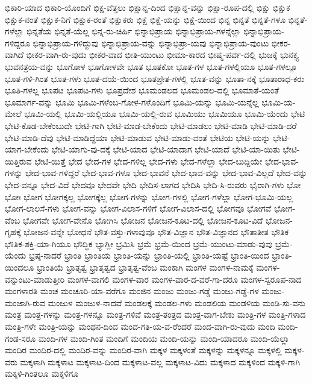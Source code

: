 {ಭಿಕಾರಿ-ಯಾದ
ಭಿಕಾರಿ-ಯೊಂದಿಗೆ
ಭಿಕ್ಷ-ವೆತ್ತಲು
ಭಿಕ್ಷಾನ್ನ-ದಿಂದ
ಭಿಕ್ಷಾನ್ನ-ವನ್ನು
ಭಿಕ್ಷಾ-ರೂಪ-ದಲ್ಲಿ
ಭಿಕ್ಷು
ಭಿಕ್ಷುಕ
ಭಿಕ್ಷುಕ-ನಂತೆ
ಭಿಕ್ಷುಕ-ನಿಗೆ
ಭಿಕ್ಷುಕ-ರಂತೆ
ಭಿಕ್ಷುಕರು
ಭಿಕ್ಷೆ
ಭಿಕ್ಷೆ-ಯನ್ನು
ಭಿಕ್ಷೆ-ಯಿಂದ
ಭಿನ್ನ
ಭಿನ್ನತೆ
ಭಿನ್ನತೆ-ಗಳೂ
ಭಿನ್ನತೆ-ಗಳೆಲ್ಲಾ
ಭಿನ್ನತೆಯ
ಭಿನ್ನತೆ-ಯೆಲ್ಲ
ಭಿನ್ನ-ರು-ಚಿರ್ಹಿ
ಭಿನ್ನಾಭಿಪ್ರಾಯ
ಭಿನ್ನಾಭಿಪ್ರಾಯ-ಗಳನ್ನೆಲ್ಲಾ
ಭಿನ್ನಾಭಿಪ್ರಾಯ-ಗಳಿದ್ದರೂ
ಭಿನ್ನಾಭಿಪ್ರಾಯ-ಗಳಿದ್ದುವು
ಭಿನ್ನಾಭಿಪ್ರಾಯ-ವನ್ನು
ಭಿನ್ನಾಭಿಪ್ರಾ-ಯವು
ಭಿನ್ನಾಭಿಪ್ರಾಯ-ವುಂಟು
ಭೀಕರ-ವಾಗಿದೆ
ಭೀಕರ-ವಾಗಿ-ರು-ವುದು
ಭೀಕರ-ವಾದ
ಭೀತಿ-ಯುಂಟು
ಭೀಮಾ-ಕಾರದ
ಭೀಷ್ಮ-ಪರ್ವ-ದಲ್ಲಿ
ಭುಜಕ್ಕೆ
ಭುನಕ್ತ್ಯ
ಭುವನತ್ರಯ-ವನ್ನು
ಭೂಗೋಳ
ಭೂಗೋಳವೇ
ಭೂತ
ಭೂತಕೋ
ಭೂತ-ಗಳ
ಭೂತ-ಗಳಲ್ಲಿಯೂ
ಭೂತ-ಗಳಲ್ಲೂ
ಭೂತ-ಗಳಿ-ಗಿಂತ
ಭೂತ-ಗಳು
ಭೂತ-ದಯೆ-ಯಿಂದ
ಭೂತಪ್ರೇತ-ಗಳಲ್ಲಿ
ಭೂತ-ವನ್ನು
ಭೂತಾ-ನಕ್ಕೆ
ಭೂತಾರಾಧ-ಕರು
ಭೂತಿ-ಗಳಲ್ಲ
ಭೂಪಟ
ಭೂಪಟ-ಗಳು
ಭೂಪ್ರದೇಶ
ಭೂಮಂಡಲದ
ಭೂಮಂಡಲ-ದಲ್ಲಿ
ಭೂಮಾತೆ-ಯಂತೆ
ಭೂಮಾರ್ಗ-ವನ್ನು
ಭೂಮಿ
ಭೂಮಿ-ಗಳೆಂಬ-ಗೋಳ-ಗಳೊಂದಿಗೆ
ಭೂಮಿ-ಯನ್ನು
ಭೂಮಿ-ಯನ್ನೆಲ್ಲ
ಭೂಮಿ-ಯ-ಮೇಲೆ
ಭೂಮಿ-ಯಲ್ಲಿ
ಭೂಮಿ-ಯಲ್ಲಿಯೂ
ಭೂಮಿ-ಯಲ್ಲಿ-ರುವ
ಭೂಮಿಯು
ಭೂಮಿಯೂ
ಭೂಮಿ-ಯೆಂದು
ಭೇಟಿ
ಭೇಟಿ-ಕೊಡ-ಬೇಕೆಂಬುದೇ
ಭೇಟಿ-ಗಾಗಿ
ಭೇಟಿ-ಮಾಡ-ಬೇಕೆಂದು
ಭೇಟಿ-ಮಾಡಲು
ಭೇಟಿ-ಮಾಡಿ
ಭೇಟಿ-ಮಾಡಿ-ದರೆ
ಭೇಟಿ-ಮಾಡಿ-ದೆವು
ಭೇಟಿ-ಮಾಡಿದ್ದೆಯಾ
ಭೇಟಿ-ಮಾಡುವ
ಭೇಟಿ-ಮಾಡು-ವಂತೆ
ಭೇಟಿಯ
ಭೇಟಿ-ಯನ್ನು
ಭೇಟಿ-ಯಾಗ-ಬೇಕೆಂದು
ಭೇಟಿ-ಯಾಗು-ವು-ದಕ್ಕೆ
ಭೇಟಿ-ಯಾದ
ಭೇಟಿ-ಯಾದಾಗ
ಭೇಟಿ-ಯಾದೆ
ಭೇಟಿ-ಯಾ-ಯಿತು
ಭೇಟಿ-ಯಿತ್ತಿರುವ
ಭೇಟಿ-ಯಿತ್ತೆ
ಭೇದ
ಭೇದ-ಗಳ
ಭೇದ-ಗಳಿಲ್ಲ
ಭೇದ-ಗಳು
ಭೇದ-ಗಳೆಲ್ಲಾ
ಭೇದ-ಬುದ್ದಿಯೇ
ಭೇದ-ಭಾವ-ಗಳನ್ನು
ಭೇದ-ಭಾವ-ಗಳಿದ್ದರೆ
ಭೇದ-ಭಾವ-ಗಳೂ
ಭೇದ-ಭಾವನೆ
ಭೇದ-ಭಾವ-ವನ್ನು
ಭೇದ-ಭಾವ-ವಿಲ್ಲದೆ
ಭೇದ-ವನ್ನು
ಭೇದ-ವನ್ನೂ
ಭೇದ-ವಿದೆ
ಭೇದವೂ
ಭೇದವೇ
ಭೇದಿ
ಭೇದಿಸ-ಲಾಗದ
ಭೇದಿಸಿ
ಭೇದಿ-ಸಿ-ರುವರು
ಭೈರಾಗಿ-ಗಳು
ಭೋ
ಭೋಃ
ಭೋಗ
ಭೋಗಕ್ಕಲ್ಲ
ಭೋಗಕ್ಕೆಲ್ಲ
ಭೋಗ-ಗಳನ್ನು
ಭೋಗ-ಗಳಲ್ಲಿ
ಭೋಗ-ಗಳೆಲ್ಲಾ
ಭೋಗ-ಭೂಮಿ-ಯಲ್ಲ
ಭೋಗ-ಲಾಲಸೆ-ಗಳು
ಭೋಗ-ವನ್ನು
ಭೋಗ-ವಿಲಾಸ-ಗಳಿಗೆ
ಭೋಗ-ವಿಲಾಸ-ದಲ್ಲಿ
ಭೋಗವೂ
ಭೋಗವೆ
ಭೋಗ-ವೆಂಬ
ಭೋಗವೇ
ಭೋಗ-ವೇನೊ
ಭೋಗಿಸಿ
ಭೋಜನ
ಭೋಜನ-ಕೂಟ-ದಲ್ಲಿ
ಭೋಜನ-ಕೂಟ-ವಿದೆ
ಭೋಜನ-ಗೃಹಕ್ಕೆ
ಭೋಜನ-ವನ್ನೇ
ಭೋಧನೆ
ಭೌತ-ವಸ್ತು-ಗಳಾವುವೂ
ಭೌತ-ವಿಜ್ಞಾನ
ಭೌತ-ವಿಜ್ಞಾನದ
ಭೌತಾತೀತ
ಭೌತಿಕ
ಭೌತಿಕ-ಶಕ್ತಿ-ಯಾ-ಗಿಯೂ
ಭೌದ್ಧಿಕ
ಭ್ಯಾಗ್ಲೀ
ಭ್ರಮಿಸಿ
ಭ್ರಮೆ
ಭ್ರಮೆ-ಯಿಂದ
ಭ್ರಮೆ-ಯುಂಟು-ಮಾಡು-ವುವು
ಭ್ರಮೆ-ಯೆಂದು
ಭ್ರಷ್ಠ-ನಾದರೆ
ಭ್ರಾಂತಿ
ಭ್ರಾಂತಿಯ
ಭ್ರಾಂತಿ-ಯನ್ನು
ಭ್ರಾಂತಿ-ಯಲ್ಲಿ
ಭ್ರಾಂತಿ-ಯಷ್ಟೆ
ಭ್ರಾಂತಿ-ಯಿಂದ
ಭ್ರಾಂತಿ-ಯಿಂದಲೂ
ಭ್ರಾಂತಿಯೆ
ಭ್ರಾತೃತ್ವ
ಭ್ರಾತೃತ್ವದ
ಭ್ರಾತೃತ್ವ-ವೆಂಬ
ಮಂಕಾಗಿ
ಮಂಗಳ
ಮಂಗಳ-ನಾಮಕ್ಕೆ
ಮಂಗಳ-ವನ್ನುಂಟು-ಮಾಡುತ್ತೀರಿ
ಮಂಗಳ-ವಾಗಲಿ
ಮಂಗಳ-ವಾರ
ಮಂಗಳ-ವಾರ-ದ-ವರೆ-ಗಾ-ದರೂ
ಮಂಗಳ-ಸ್ವರೂಪ-ನಾದ
ಮಂಗಳಾರತಿ
ಮಂಚ
ಮಂಚೂರಿ-ಯಾ-ವರೆಗೂ
ಮಂಜಿನ
ಮಂಜು
ಮಂಜು-ಗಡ್ಡೆ
ಮಂಜು-ಗಡ್ಡೆ-ಗಳ
ಮಂಜು-ಮಂಜಾಗಿ-ರುವ
ಮಂಜುಳ
ಮಂಜುಳ-ನಾದವೆ
ಮಂಡಲಕ್ಕೆ
ಮಂಡಲ-ಗಳು
ಮಂಡಲಿಯ
ಮಂಡಳಿಯ
ಮಂಡಿ-ಸು-ವನು
ಮಂತ್ರ
ಮಂತ್ರ-ಗಳನ್ನು
ಮಂತ್ರ-ಗಳನ್ನೂ
ಮಂತ್ರ-ಗಳಿವೆ
ಮಂತ್ರ-ತಂತ್ರದ
ಮಂತ್ರ-ವಾಗ-ಬೇಕು
ಮಂತ್ರಿ-ಗಳ
ಮಂತ್ರಿ-ಗಳಾದ
ಮಂತ್ರಿ-ಗಳೇ
ಮಂತ್ರಿ-ಯನ್ನು
ಮಂಥನ-ದಿಂದ
ಮಂದ-ಗತಿ-ಯ-ವ-ರೆಂದರೆ
ಮಂದ-ವಾಗಿ-ರು-ವುದು
ಮಂದಿ
ಮಂದಿ-ಗಂಡ-ಸರೂ
ಮಂದಿ-ಗಳ
ಮಂದಿ-ಗಿಂತ
ಮಂದಿಗೆ
ಮಂದಿಯ
ಮಂದಿ-ಯನ್ನು
ಮಂದಿ-ಯಾದರೂ
ಮಂದಿ-ಯೆಲ್ಲಾ
ಮಂದಿರ
ಮಂದಿರ-ದಲ್ಲಿ
ಮಂದಿರ-ವನ್ನು
ಮಂದಿರ-ವಾಗಿ
ಮಕ್ಕಳ
ಮಕ್ಕಳಂತೆ
ಮಕ್ಕಳನ್ನು
ಮಕ್ಕಳನ್ನೂ
ಮಕ್ಕಳಲ್ಲಿ
ಮಕ್ಕಳ-ವರು
ಮಕ್ಕಳಾಗಿ
ಮಕ್ಕಳಾಟ
ಮಕ್ಕಳಾಟ-ದಿಂದ
ಮಕ್ಕಳಾಟ-ವಲ್ಲ
ಮಕ್ಕಳಾಟ-ವಿದು
ಮಕ್ಕಳಾದ
ಮಕ್ಕಳಿಂದ
ಮಕ್ಕಳಿ-ಗಾಗಿ
ಮಕ್ಕಳಿ-ಗಿಂತಲೂ
ಮಕ್ಕಳಿಗೂ
}
